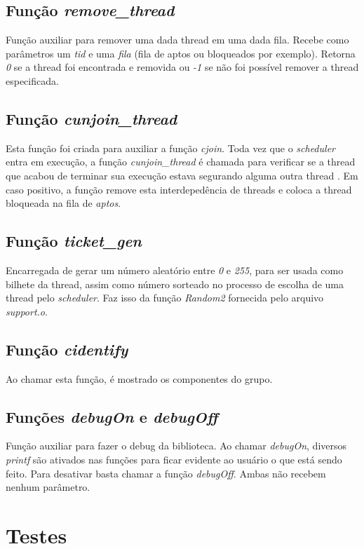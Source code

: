 \documentclass{article}
\begin{document}
\subsection{Função \textit{remove\_thread}}
Função auxiliar para remover uma dada thread em uma dada fila. Recebe como parâmetros um \textit{tid} e uma \textit{fila} (fila de aptos ou bloqueados por exemplo). Retorna \textit{0} se a thread foi encontrada e removida ou \textit{-1} se não foi possível remover a thread especificada.

\subsection{Função \textit{cunjoin\_thread}}
Esta função foi criada para auxiliar a função \textit{cjoin}. Toda vez que o \textit{scheduler} entra em execução, a função \textit{cunjoin\_thread} é chamada para verificar se a thread que acabou de terminar sua execução estava segurando alguma outra thread \footnotemark. Em caso positivo, a função remove esta interdepedência de threads e coloca a thread bloqueada na fila de \textit{aptos}.

\subsection{Função \textit{ticket\_gen}}
Encarregada de gerar um número aleatório entre \textit{0} e \textit{255}, para ser usada como bilhete da thread, assim como número sorteado no processo de escolha de uma thread pelo \textit{scheduler}. Faz isso da função \textit{Random2} fornecida pelo arquivo \textit{support.o}.

\subsection{Função \textit{cidentify}}
Ao chamar esta função, é mostrado os componentes do grupo.

\subsection{Funções \textit{debugOn} e \textit{debugOff}}
Função auxiliar para fazer o debug da biblioteca. Ao chamar \textit{debugOn}, diversos \textit{printf} são ativados nas funções para ficar evidente ao usuário o que está sendo feito. Para desativar basta chamar a função \textit{debugOff}. Ambas não recebem nenhum parâmetro.

\section{Testes}
\end{document}
